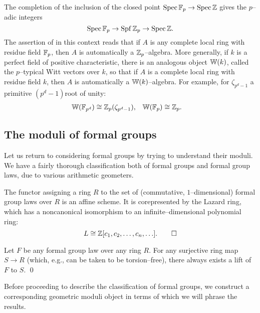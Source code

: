 \begin{example}
The completion of the inclusion of the closed point $\operatorname{Spec} \mathbb F_p \to \operatorname{Spec} \mathbb Z$ gives the $p$--adic integers \[\operatorname{Spec} \mathbb F_p \to \operatorname{Spf} \mathbb Z_p \to \operatorname{Spec} \mathbb Z.\] The assertion of  in this context reads that if $A$ is any complete local ring with residue field $\mathbb F_p$, then $A$ is automatically a $\mathbb Z_p$--algebra.  More generally, if $k$ is a perfect field of positive characteristic, there is an analogous object $\mathbb W(k)$, called the $p$--typical Witt vectors over $k$, so that if $A$ is a complete local ring with residue field $k$, then $A$ is automatically a $\mathbb W(k)$--algebra.  For example, for $\zeta_{p^d-1}$ a primitive $(p^d-1)$\th root of unity:
\begin{align*}
\mathbb W(\mathbb F_{p^d}) & \cong \mathbb Z_p(\zeta_{p^d-1}), & \mathbb W(\mathbb F_p) & \cong \mathbb Z_p.
\end{align*}
\end{example}

\subsection*{The moduli of formal groups}

Let us return to considering formal groups by trying to understand their moduli.  We have a fairly thorough classification both of formal groups and formal group laws, due to various arithmetic geometers.

\begin{theorem}\label{DefnLazardRing}
The functor assigning a ring $R$ to the set of (commutative, $1$--dimensional) formal group laws over $R$ is an affine scheme.  It is corepresented by the Lazard ring, which has a noncanonical isomorphism to an infinite--dimensional polynomial ring: \[L \cong \mathbb Z[c_1, c_2, \ldots, c_n, \ldots]. \qed\]
\end{theorem}

\begin{corollary}\label{TorsionFreeLifts}
Let $F$ be any formal group law over any ring $R$.  For any surjective ring map $S \to R$ (which, e.g., can be taken to be torsion--free), there always exists a lift of $F$ to $S$. \qed
\end{corollary}

Before proceeding to describe the classification of formal groups, we construct a corresponding geometric moduli object in terms of which we will phrase the results.

